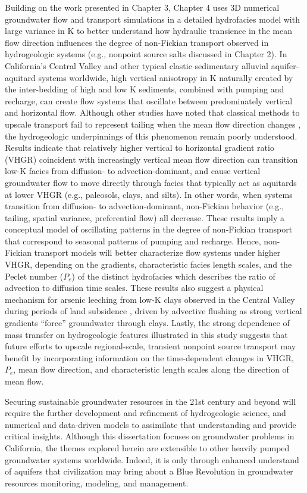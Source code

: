Building on the work presented in Chapter 3, Chapter 4 uses 3D numerical groundwater flow and transport simulations in a detailed hydrofacies model with large variance in K \citep{weissmann1999multi} to better understand how hydraulic transience in the mean flow direction influences the degree of non-Fickian transport observed in hydrogeologic systems (e.g., nonpoint source salts discussed in Chapter 2). In California's Central Valley and other typical clastic sedimentary alluvial aquifer-aquitard systems worldwide, high vertical anisotropy in K naturally created by the inter-bedding of high and low K sediments, combined with pumping and recharge, can create flow systems that oscillate between predominately vertical and horizontal flow. Although other studies have noted that classical methods to upscale transport fail to represent tailing when the mean flow direction changes \citep{guo2019upscaling, guo2020adaptive}, the hydrogeologic underpinnings of this phenomenon remain poorly understood. Results indicate that relatively higher vertical to horizontal gradient ratio (VHGR) coincident with increasingly vertical mean flow direction can transition low-K facies from diffusion- to advection-dominant, and cause vertical groundwater flow to move directly through facies that typically act as aquitards at lower VHGR (e.g., paleosols, clays, and silts). In other words, when systems transition from diffusion- to advection-dominant, non-Fickian behavior (e.g., tailing, spatial variance, preferential flow) all decrease. These results imply a conceptual model of oscillating patterns in the degree of non-Fickian transport that correspond to seasonal patterns of pumping and recharge. Hence, non-Fickian transport models will better characterize flow systems under higher VHGR, depending on the gradients, characteristic facies length scales, and the Peclet number ($P_e$) of the distinct hydrofacies which describes the ratio of advection to diffusion time scales. These results also suggest a physical mechanism for arsenic leeching from low-K clays observed in the Central Valley during periods of land subsidence \citep{smith2018overpumping}, driven by advective flushing as strong vertical gradients ``force'' groundwater through clays. Lastly, the strong dependence of mass transfer on hydrogeologic features illustrated in this study suggests that future efforts to upscale regional-scale, transient nonpoint source transport may benefit by incorporating information on the time-dependent changes in VHGR, $P_e$, mean flow direction, and characteristic length scales along the direction of mean flow.

Securing sustainable groundwater resources in the 21st century and beyond will require the further development and refinement of hydrogeologic science, and numerical and data-driven models to assimilate that understanding and provide critical insights. Although this dissertation focuses on groundwater problems in California, the themes explored herein are extensible to other heavily pumped groundwater systems worldwide. Indeed, it is only through enhanced understand of aquifers that civilization may bring about a Blue Revolution in groundwater resources monitoring, modeling, and management.

\clearpage